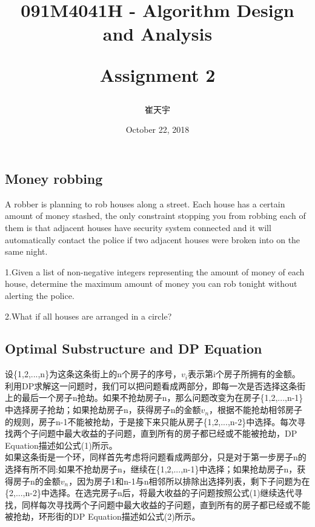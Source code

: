 \documentclass{article}
\begin{document}
\begin{CJK*}{UTF8}{gbsn}

\title{091M4041H - Algorithm Design and Analysis\\ [2ex] \begin{large} Assignment 2 \end{large}}
\author{崔天宇}
\date{October 22, 2018}

\maketitle

\tableofcontents

\newpage
\section{Money robbing}

A robber is planning to rob houses along a street. Each house has a certain amount of money stashed, the only constraint stopping you from robbing each of them is that adjacent houses have security system connected and it will automatically contact the police if two adjacent houses were broken into on the same night.

1.Given a list of non-negative integers representing the amount of money of each house, determine the maximum amount of money you can rob tonight without alerting the police.

2.What if all houses are arranged in a circle?

\subsection{Optimal Substructure and DP Equation}

设\{1,2,...,n\}为这条这条街上的n个房子的序号，$v_i$表示第i个房子所拥有的金额。
\\

利用DP求解这一问题时，我们可以把问题看成两部分，即每一次是否选择这条街上的最后一个房子n抢劫。如果不抢劫房子n，那么问题改变为在房子\{1,2,...,n-1\}中选择房子抢劫；如果抢劫房子n，获得房子n的金额$v_n$，根据不能抢劫相邻房子的规则，房子n-1不能被抢劫，于是接下来只能从房子\{1,2,...,n-2\}中选择。每次寻找两个子问题中最大收益的子问题，直到所有的房子都已经或不能被抢劫，DP Equation描述如公式(1)所示。
\\

如果这条街是一个环，同样首先考虑将问题看成两部分，只是对于第一步房子n的选择有所不同:如果不抢劫房子n，继续在\{1,2,...,n-1\}中选择；如果抢劫房子n，获得房子n的金额$v_n$，因为房子1和n-1与n相邻所以排除出选择列表，剩下子问题为在\{2,...,n-2\}中选择。在选完房子n后，将最大收益的子问题按照公式(1)继续迭代寻找，同样每次寻找两个子问题中最大收益的子问题，直到所有的房子都已经或不能被抢劫，环形街的DP Equation描述如公式(2)所示。




\end{CJK*}
\end{document}
